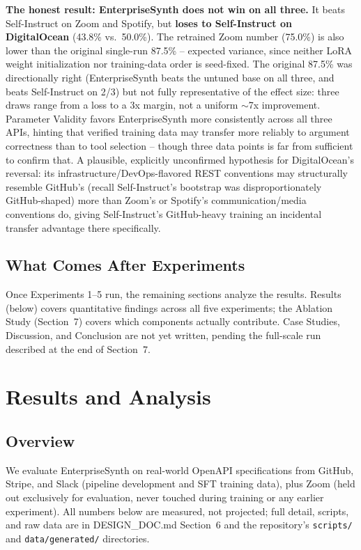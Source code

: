\documentclass[11pt]{article}
\begin{document}
\textbf{The honest result: EnterpriseSynth does not win on all three.} It beats Self-Instruct on
Zoom and Spotify, but \textbf{loses to Self-Instruct on DigitalOcean} (43.8\% vs.\ 50.0\%). The
retrained Zoom number (75.0\%) is also lower than the original single-run 87.5\% -- expected
variance, since neither LoRA weight initialization nor training-data order is seed-fixed. The
original 87.5\% was directionally right (EnterpriseSynth beats the untuned base on all three, and
beats Self-Instruct on 2/3) but not fully representative of the effect size: three draws range
from a loss to a 3x margin, not a uniform $\sim$7x improvement. Parameter Validity favors
EnterpriseSynth more consistently across all three APIs, hinting that verified training data may
transfer more reliably to argument correctness than to tool selection -- though three data points
is far from sufficient to confirm that. A plausible, explicitly unconfirmed hypothesis for
DigitalOcean's reversal: its infrastructure/DevOps-flavored REST conventions may structurally
resemble GitHub's (recall Self-Instruct's bootstrap was disproportionately GitHub-shaped) more
than Zoom's or Spotify's communication/media conventions do, giving Self-Instruct's GitHub-heavy
training an incidental transfer advantage there specifically.

\subsection{What Comes After Experiments}
Once Experiments 1--5 run, the remaining sections analyze the results. Results (below) covers
quantitative findings across all five experiments; the Ablation Study (Section~7) covers which
components actually contribute. Case Studies, Discussion, and Conclusion are not yet written,
pending the full-scale run described at the end of Section~7.

\section{Results and Analysis}

\subsection{Overview}
We evaluate EnterpriseSynth on real-world OpenAPI specifications from GitHub, Stripe, and Slack
(pipeline development and SFT training data), plus Zoom (held out exclusively for evaluation,
never touched during training or any earlier experiment). All numbers below are measured, not
projected; full detail, scripts, and raw data are in DESIGN\_DOC.md Section~6 and the repository's
\texttt{scripts/} and \texttt{data/generated/} directories.
\end{document}
